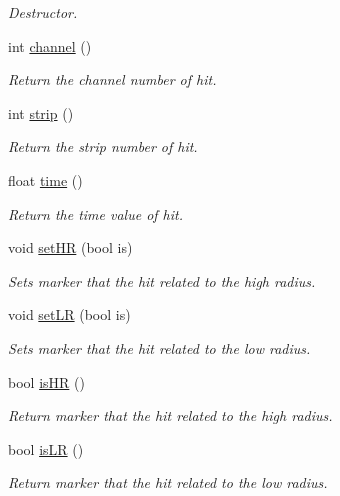 \begin{DoxyCompactItemize}
\begin{DoxyCompactList}\small\item\em Destructor. \end{DoxyCompactList}\item 
int \hyperlink{classiRPCHit_a43474d73adf4e2a643bf04612e1ac33d}{channel} ()
\begin{DoxyCompactList}\small\item\em Return the channel number of hit. \end{DoxyCompactList}\item 
int \hyperlink{classiRPCHit_a11730bd1b375b16e381ce08fee14609e}{strip} ()
\begin{DoxyCompactList}\small\item\em Return the strip number of hit. \end{DoxyCompactList}\item 
float \hyperlink{classiRPCHit_ad57a1f96493e5144c03099481984260b}{time} ()
\begin{DoxyCompactList}\small\item\em Return the time value of hit. \end{DoxyCompactList}\item 
void \hyperlink{classiRPCHit_a3dbe5410d52a00a15d7471a36a150151}{set\-H\-R} (bool is)
\begin{DoxyCompactList}\small\item\em Sets marker that the hit related to the high radius. \end{DoxyCompactList}\item 
void \hyperlink{classiRPCHit_af76d837102b4d2467b2fd8b1752e4ab8}{set\-L\-R} (bool is)
\begin{DoxyCompactList}\small\item\em Sets marker that the hit related to the low radius. \end{DoxyCompactList}\item 
bool \hyperlink{classiRPCHit_af9d3de68768db96f27fdc28eebaffec7}{is\-H\-R} ()
\begin{DoxyCompactList}\small\item\em Return marker that the hit related to the high radius. \end{DoxyCompactList}\item 
bool \hyperlink{classiRPCHit_a9f3b5d91b4a9dcb651d033ca01ac35fb}{is\-L\-R} ()
\begin{DoxyCompactList}\small\item\em Return marker that the hit related to the low radius. \end{DoxyCompactList}\end{DoxyCompactItemize}


